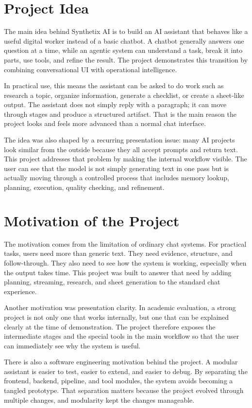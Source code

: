 \documentclass[11pt,oneside]{report}
\newcommand{\ProjectTitle}{Synthetix AI}
\begin{document}
\section{Project Idea}
The main idea behind \ProjectTitle{} is to build an AI assistant that behaves like a useful digital worker instead of a basic chatbot. A chatbot generally answers one question at a time, while an agentic system can understand a task, break it into parts, use tools, and refine the result. The project demonstrates this transition by combining conversational UI with operational intelligence.

In practical use, this means the assistant can be asked to do work such as research a topic, organize information, generate a checklist, or create a sheet-like output. The assistant does not simply reply with a paragraph; it can move through stages and produce a structured artifact. That is the main reason the project looks and feels more advanced than a normal chat interface.

The idea was also shaped by a recurring presentation issue: many AI projects look similar from the outside because they all accept prompts and return text. This project addresses that problem by making the internal workflow visible. The user can see that the model is not simply generating text in one pass but is actually moving through a controlled process that includes memory lookup, planning, execution, quality checking, and refinement.

\section{Motivation of the Project}
The motivation comes from the limitation of ordinary chat systems. For practical tasks, users need more than generic text. They need evidence, structure, and follow-through. They also need to see how the system is working, especially when the output takes time. This project was built to answer that need by adding planning, streaming, research, and sheet generation to the standard chat experience.

Another motivation was presentation clarity. In academic evaluation, a strong project is not only one that works internally, but one that can be explained clearly at the time of demonstration. The project therefore exposes the intermediate stages and the special tools in the main workflow so that the user can immediately see why the system is useful.

There is also a software engineering motivation behind the project. A modular assistant is easier to test, easier to extend, and easier to debug. By separating the frontend, backend, pipeline, and tool modules, the system avoids becoming a tangled prototype. That separation matters because the project evolved through multiple changes, and modularity kept the changes manageable.
\end{document}
